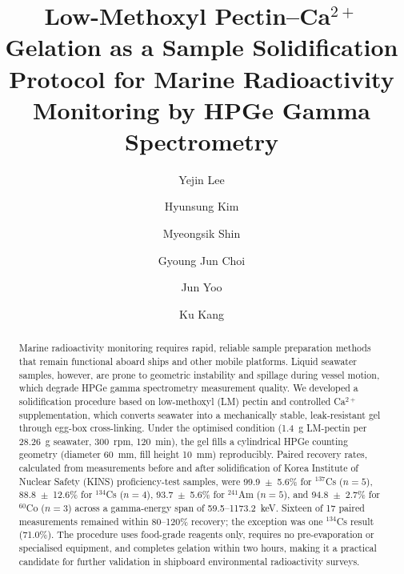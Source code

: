 \documentclass[preprint,12pt]{elsarticle}
\begin{document}
\begin{frontmatter}

\title{Low-Methoxyl Pectin--Ca$^{2+}$ Gelation as a Sample
Solidification Protocol for Marine Radioactivity Monitoring
by HPGe Gamma Spectrometry}

\author[inst1]{Yejin Lee}   %
\author[inst2]{Hyunsung Kim}   %
\author[inst1]{Myeongsik Shin}
\author[inst1]{Gyoung Jun Choi}   %
\author[inst1]{Jun Yoo}
\author[inst1]{Ku Kang}





\begin{abstract}
Marine radioactivity monitoring requires rapid, reliable sample preparation
methods that remain functional aboard ships and other mobile platforms.
Liquid seawater samples, however, are prone to geometric instability and
spillage during vessel motion, which degrade HPGe gamma spectrometry
measurement quality.
We developed a solidification procedure based on low-methoxyl (LM) pectin
and controlled Ca$^{2+}$ supplementation, which converts seawater into a
mechanically stable, leak-resistant gel through egg-box cross-linking.
Under the optimised condition (1.4~g LM-pectin per 28.26~g seawater,
300~rpm, 120~min), the gel fills a cylindrical HPGe counting geometry
(diameter 60~mm, fill height 10~mm) reproducibly.
Paired recovery rates, calculated from measurements before and after
solidification of Korea Institute of Nuclear Safety (KINS)
proficiency-test samples, were
99.9~$\pm$~5.6\% for $^{137}$Cs ($n=5$),
88.8~$\pm$~12.6\% for $^{134}$Cs ($n=4$),
93.7~$\pm$~5.6\% for $^{241}$Am ($n=5$),
and 94.8~$\pm$~2.7\% for $^{60}$Co ($n=3$)
across a gamma-energy span of 59.5--1173.2~keV.
Sixteen of 17 paired measurements remained within 80--120\% recovery;
the exception was one $^{134}$Cs result (71.0\%).
The procedure uses food-grade reagents only, requires no pre-evaporation
or specialised equipment, and completes gelation within two hours,
making it a practical candidate for further validation in shipboard
environmental radioactivity surveys.
\end{abstract}


\end{frontmatter}
\end{document}
